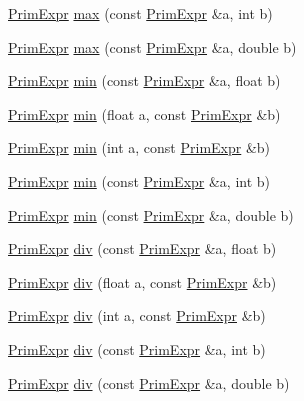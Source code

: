 \begin{DoxyCompactItemize}
\item 
\hyperlink{classtvm_1_1PrimExpr}{Prim\+Expr} \hyperlink{namespacetvm_ac0dc60ecafe41384d28baf92f6943680}{max} (const \hyperlink{classtvm_1_1PrimExpr}{Prim\+Expr} \&a, int b)
\item 
\hyperlink{classtvm_1_1PrimExpr}{Prim\+Expr} \hyperlink{namespacetvm_aa26bf5f7b12b17f87400c63c63663c60}{max} (const \hyperlink{classtvm_1_1PrimExpr}{Prim\+Expr} \&a, double b)
\item 
\hyperlink{classtvm_1_1PrimExpr}{Prim\+Expr} \hyperlink{namespacetvm_a1a8d2a9b2868033477024d551f779d61}{min} (const \hyperlink{classtvm_1_1PrimExpr}{Prim\+Expr} \&a, float b)
\item 
\hyperlink{classtvm_1_1PrimExpr}{Prim\+Expr} \hyperlink{namespacetvm_a6ebe9e5428f481f683f89f59440dde2a}{min} (float a, const \hyperlink{classtvm_1_1PrimExpr}{Prim\+Expr} \&b)
\item 
\hyperlink{classtvm_1_1PrimExpr}{Prim\+Expr} \hyperlink{namespacetvm_a3b4b479c377151a9d64dc67d1105421e}{min} (int a, const \hyperlink{classtvm_1_1PrimExpr}{Prim\+Expr} \&b)
\item 
\hyperlink{classtvm_1_1PrimExpr}{Prim\+Expr} \hyperlink{namespacetvm_a7fe0dbe362aac3d4f9c204eeba803d8e}{min} (const \hyperlink{classtvm_1_1PrimExpr}{Prim\+Expr} \&a, int b)
\item 
\hyperlink{classtvm_1_1PrimExpr}{Prim\+Expr} \hyperlink{namespacetvm_a468d959980234ccc84c319810d787219}{min} (const \hyperlink{classtvm_1_1PrimExpr}{Prim\+Expr} \&a, double b)
\item 
\hyperlink{classtvm_1_1PrimExpr}{Prim\+Expr} \hyperlink{namespacetvm_ae2d70142d842bb07be508adb2d4f7447}{div} (const \hyperlink{classtvm_1_1PrimExpr}{Prim\+Expr} \&a, float b)
\item 
\hyperlink{classtvm_1_1PrimExpr}{Prim\+Expr} \hyperlink{namespacetvm_a85c28d529a26976f3d5f67511f2aef8b}{div} (float a, const \hyperlink{classtvm_1_1PrimExpr}{Prim\+Expr} \&b)
\item 
\hyperlink{classtvm_1_1PrimExpr}{Prim\+Expr} \hyperlink{namespacetvm_a8a958cb2612b58e6464f5421bb8ab74b}{div} (int a, const \hyperlink{classtvm_1_1PrimExpr}{Prim\+Expr} \&b)
\item 
\hyperlink{classtvm_1_1PrimExpr}{Prim\+Expr} \hyperlink{namespacetvm_ac9f587b864957447e3d0c64ac9159633}{div} (const \hyperlink{classtvm_1_1PrimExpr}{Prim\+Expr} \&a, int b)
\item 
\hyperlink{classtvm_1_1PrimExpr}{Prim\+Expr} \hyperlink{namespacetvm_a1180d1f0ef1d427bad98a89c66d84c0f}{div} (const \hyperlink{classtvm_1_1PrimExpr}{Prim\+Expr} \&a, double b)

\end{DoxyCompactItemize}
